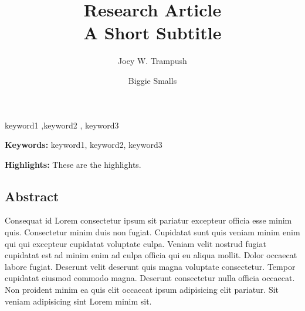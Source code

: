 \documentclass[
  super,
  preprint,
  3p]{elsarticle}
\renewcommand*\contentsname{Table of contents}
\newcommand\contentsname{Table of contents}
\begin{document}
\begin{frontmatter}
\title{Research Article \\\large{A Short Subtitle} }
\author[1]{Joey W. Trampush%
%
}
\author[2]{Biggie Smalls%
%
}


        





\begin{keyword}
    keyword1 \sep keyword2 \sep 
    keyword3
\end{keyword}
\end{frontmatter}
    \ifdefined\Shaded\renewenvironment{Shaded}{\begin{tcolorbox}[interior hidden, borderline west={3pt}{0pt}{shadecolor}, frame hidden, boxrule=0pt, sharp corners, breakable, enhanced]}{\end{tcolorbox}}\fi

\renewcommand*\contentsname{Table of contents}
{
\hypersetup{linkcolor=}
\setcounter{tocdepth}{3}
\tableofcontents
}
\textbf{Keywords:} keyword1, keyword2, keyword3

\textbf{Highlights:} These are the highlights.

\hypertarget{abstract}{%
\subsection{Abstract}\label{abstract}}

Consequat id Lorem consectetur ipsum sit pariatur excepteur officia esse
minim quis. Consectetur minim duis non fugiat. Cupidatat sunt quis
veniam minim enim qui qui excepteur cupidatat voluptate culpa. Veniam
velit nostrud fugiat cupidatat est ad minim enim ad culpa officia qui eu
aliqua mollit. Dolor occaecat labore fugiat. Deserunt velit deserunt
quis magna voluptate consectetur. Tempor cupidatat eiusmod commodo
magna. Deserunt consectetur nulla officia occaecat. Non proident minim
ea quis elit occaecat ipsum adipisicing elit pariatur. Sit veniam
adipisicing sint Lorem minim sit.
\end{document}
